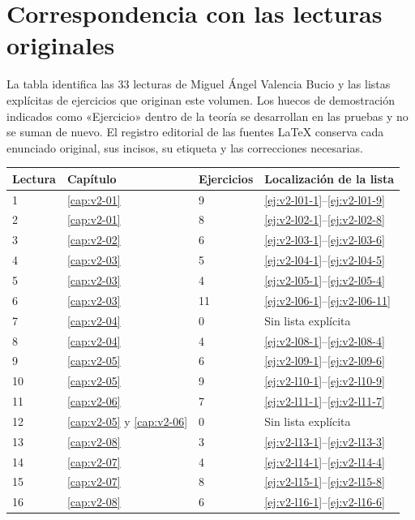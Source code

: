 \chapter*{Correspondencia con las lecturas originales}
La tabla identifica las 33 lecturas de Miguel Ángel Valencia Bucio y las listas explícitas de ejercicios que originan este volumen. Los huecos de demostración indicados como «Ejercicio» dentro de la teoría se desarrollan en las pruebas y no se suman de nuevo. El registro editorial de las fuentes LaTeX conserva cada enunciado original, sus incisos, su etiqueta y las correcciones necesarias.
{\small
\begin{longtable}{@{}p{}p{}p{}p{}@{}}
\toprule Lectura & Capítulo & Ejercicios & Localización de la lista \\\midrule\endhead
1 & \ref{cap:v2-01} & 9 & \ref{ej:v2-l01-1}--\ref{ej:v2-l01-9} \\
2 & \ref{cap:v2-01} & 8 & \ref{ej:v2-l02-1}--\ref{ej:v2-l02-8} \\
3 & \ref{cap:v2-02} & 6 & \ref{ej:v2-l03-1}--\ref{ej:v2-l03-6} \\
4 & \ref{cap:v2-03} & 5 & \ref{ej:v2-l04-1}--\ref{ej:v2-l04-5} \\
5 & \ref{cap:v2-03} & 4 & \ref{ej:v2-l05-1}--\ref{ej:v2-l05-4} \\
6 & \ref{cap:v2-03} & 11 & \ref{ej:v2-l06-1}--\ref{ej:v2-l06-11} \\
7 & \ref{cap:v2-04} & 0 & Sin lista explícita \\
8 & \ref{cap:v2-04} & 4 & \ref{ej:v2-l08-1}--\ref{ej:v2-l08-4} \\
9 & \ref{cap:v2-05} & 6 & \ref{ej:v2-l09-1}--\ref{ej:v2-l09-6} \\
10 & \ref{cap:v2-05} & 9 & \ref{ej:v2-l10-1}--\ref{ej:v2-l10-9} \\
11 & \ref{cap:v2-06} & 7 & \ref{ej:v2-l11-1}--\ref{ej:v2-l11-7} \\
12 & \ref{cap:v2-05} y \ref{cap:v2-06} & 0 & Sin lista explícita \\
13 & \ref{cap:v2-08} & 3 & \ref{ej:v2-l13-1}--\ref{ej:v2-l13-3} \\
14 & \ref{cap:v2-07} & 4 & \ref{ej:v2-l14-1}--\ref{ej:v2-l14-4} \\
15 & \ref{cap:v2-07} & 8 & \ref{ej:v2-l15-1}--\ref{ej:v2-l15-8} \\
16 & \ref{cap:v2-08} & 6 & \ref{ej:v2-l16-1}--\ref{ej:v2-l16-6} \\

\end{longtable}}
